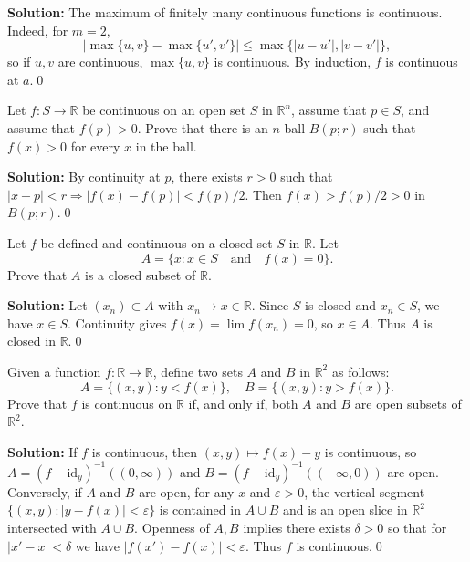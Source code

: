 \noindent\textbf{Solution:}
The maximum of finitely many continuous functions is continuous. Indeed, for $m=2$,
\[
|\max\{u,v\}-\max\{u',v'\}|\le \max\{|u-u'|,|v-v'|\},
\]
so if $u,v$ are continuous, $\max\{u,v\}$ is continuous. By induction, $f$ is continuous at $a$.\qed



\begin{problembox}
Let \( f: S \to \mathbb{R} \) be continuous on an open set \( S \) in \( \mathbb{R}^n \), assume that \( p \in S \), and assume that \( f(p) > 0 \). Prove that there is an \( n \)-ball \( B(p; r) \) such that \( f(x) > 0 \) for every \( x \) in the ball.
\end{problembox}

\noindent\textbf{Solution:}
By continuity at $p$, there exists $r>0$ such that $|x-p|<r\Rightarrow |f(x)-f(p)|<f(p)/2$. Then $f(x)>f(p)/2>0$ in $B(p;r)$.\qed



\begin{problembox}
Let \( f \) be defined and continuous on a closed set \( S \) in \( \mathbb{R} \). Let
\[A = \{x : x \in S \quad \text{and} \quad f(x) = 0\}.\]
Prove that \( A \) is a closed subset of \( \mathbb{R} \).
\end{problembox}

\noindent\textbf{Solution:}
Let $(x_n)\subset A$ with $x_n\to x\in\mathbb{R}$. Since $S$ is closed and $x_n\in S$, we have $x\in S$. Continuity gives $f(x)=\lim f(x_n)=0$, so $x\in A$. Thus $A$ is closed in $\mathbb{R}$.\qed



\begin{problembox}
Given a function \( f: \mathbb{R} \to \mathbb{R} \), define two sets \( A \) and \( B \) in \( \mathbb{R}^2 \) as follows:
\[A = \{(x, y) : y < f(x)\}, \quad B = \{(x, y) : y > f(x)\}.\]
Prove that \( f \) is continuous on \( \mathbb{R} \) if, and only if, both \( A \) and \( B \) are open subsets of \( \mathbb{R}^2 \).
\end{problembox}

\noindent\textbf{Solution:}
If $f$ is continuous, then $(x,y)\mapsto f(x)-y$ is continuous, so $A=(f-\mathrm{id}_y)^{-1}((0,\infty))$ and $B=(f-\mathrm{id}_y)^{-1}(({-}\infty,0))$ are open. Conversely, if $A$ and $B$ are open, for any $x$ and $\varepsilon>0$, the vertical segment $\{(x,y):|y-f(x)|<\varepsilon\}$ is contained in $A\cup B$ and is an open slice in $\mathbb{R}^2$ intersected with $A\cup B$. Openness of $A,B$ implies there exists $\delta>0$ so that for $|x'-x|<\delta$ we have $|f(x')-f(x)|<\varepsilon$. Thus $f$ is continuous.\qed



